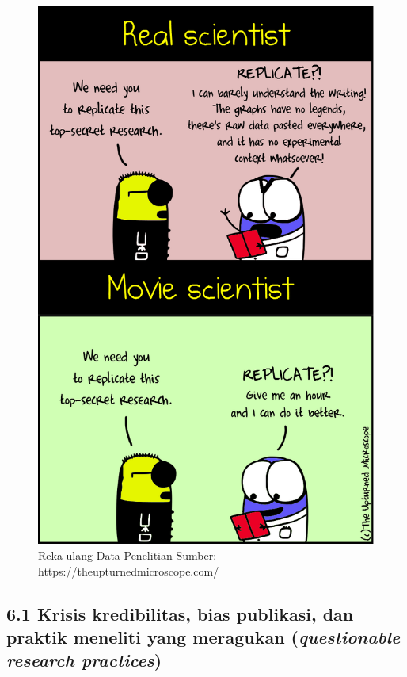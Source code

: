 \documentclass[
  english,
  man]{apa6}
\begin{document}
\begin{figure}

{\centering \includegraphics[width=7.42in]{images/replication} 

}

\caption{Reka-ulang Data Penelitian Sumber: https://theupturnedmicroscope.com/}\label{fig:unnamed-chunk-3}
\end{figure}

\hypertarget{krisis-kredibilitas-bias-publikasi-dan-praktik-meneliti-yang-meragukan-questionable-research-practices}{%
\subsection{\texorpdfstring{6.1 Krisis kredibilitas, bias publikasi, dan praktik meneliti yang meragukan (\emph{questionable research practices})}{6.1 Krisis kredibilitas, bias publikasi, dan praktik meneliti yang meragukan (questionable research practices)}}\label{krisis-kredibilitas-bias-publikasi-dan-praktik-meneliti-yang-meragukan-questionable-research-practices}}
\end{document}
